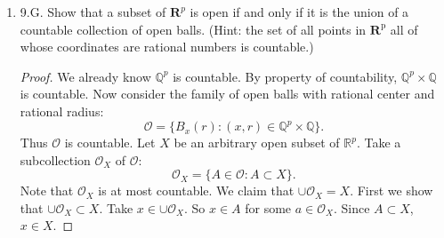 \begin{enumerate}
\begin{proof}
\begin{enumerate}
	\begin{align*}
		z_1 &= (1-t)x_1 + ty_1 \\
		    &< (1-t)x_1 + ty_2 &\text{since}y_1<y_2 \\
		    &< (1-t)x_2 + ty_2 &\text{since}x_1 < x_2 \\
		    &= z_2
	.\end{align*}
	Therefore $z \in \mathbf{K}_2$.
	\item Take $x, y \in \mathbf{K}^3$ and $t \in [0,1]$. Now define  $z = (1-t)x + ty = (x_1 + y_1, x_2 + y_2)$.
	Since $x_1\ge 0, x_2\ge 0$, we have $z_1 = (1-t)x_1+ty_1 \ge  0+0 = 0$. 
	Since $x_1\le 1, x_2\le 1$, we have $z_1 = (1-t)x_1+ty_1 \le  (1-t)\times 1+t \times 1 = 1$. 
	Also,
	\begin{align*}
		z_1 &= (1-t)x_1 + ty_1 \\
		    &\ge  (1-t)x_1 + ty_2 &\text{since}y_1\ge y_2 \\
		    &\ge  (1-t)x_2 + ty_2 &\text{since}x_1 \ge  x_2 \\
		    &= z_2
	.\end{align*}
	Therefore $z \in \mathbf{K}_3$.
\item It suffices to provide a counterexample. Take $x = (1,0)$ and $y = (-1,0)$. Now they are both elements of $\mathbf{K}_4$ since $\|x\|=\|1\| = 1$ and $\|y\|=\|-1\| = 1$.
	Now take $t = \frac{1}{2}$ and note that $(1-t)x + ty = \frac{1}{2} x + \frac{1}{2} y = \frac{1}{2} (1-1) = 0$. However $\|0\| = 0$ which does not satisfy the condition for being an element of $\mathbf{K}_4$. Hence $\mathbf{K}_4$ is not convex.
	\end{enumerate}
\end{proof}

\item 9.G. Show that a subset of $\boldsymbol{R}^p$ is open if and only if it is the union of a countable collection of open balls. (Hint: the set of all points in $\boldsymbol{R}^{\mathrm{p}}$ all of whose coordinates are rational numbers is countable.)
\begin{proof}
	We already know $\mathbb{Q}^p$ is countable. By property of countability, $\mathbb{Q}^p \times \mathbb{Q}$ is countable. Now consider the family of open balls with rational center and rational radius:
	\[
		\mathcal{O} = \{B_x(r):(x,r) \in \mathbb{Q}^p \times \mathbb{Q}\}
	.\] 
	Thus $\mathcal{O}$ is countable. Let $X$ be an arbitrary open subset of $\mathbb{R}^p$. Take a subcollection $\mathcal{O}_X$ of $\mathcal{O}$: \[
		\mathcal{O}_X = \{A \in \mathcal{O}: A \subset X\} 
	.\] Note that $\mathcal{O}_X$ is at most countable.
	We claim that $\cup \mathcal{O}_X = X$. First we show that $\cup \mathcal{O}_X \subset  X$. Take $x \in \cup \mathcal{O}_X$. So $x \in A$ for some $a \in \mathcal{O}_X$. Since $A\subset X$, $x \in X$.


\end{proof}
\end{enumerate}
